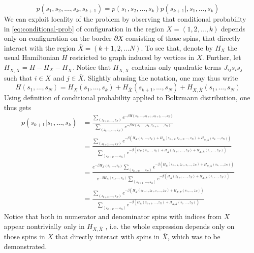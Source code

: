 \begin{equation}
\label{eq:conditional-prob}
    p(s_1, s_2, \ldots, s_k, s_{k+1}) = p(s_1, s_2, \ldots, s_k)p(s_{k+1}|, s_1, \ldots, s_k)
\end{equation}
We can exploit locality of the problem by observing that conditional probability in \eqref{eq:conditional-prob} of configuration in the region $X = (1, 2, \ldots, k)$ depends only on configuration on the border $\partial X$ consisting of those spins, that directly interact with the region $\overline{X} = (k+1, 2, \ldots N)$. To see that, denote by $H_X$ the usual Hamiltonian $H$ restricted to graph induced by vertices in $X$. Further, let $H_{X, \overline{X}} = H - H_X - H_{\overline{X}}$. Notice that $H_{X, \overline{X}}$ contains only quadratic terms $J_{ij} s_i s_j$ such that $i \in X$ and $j \in \overline{X}$. Slightly abusing the notation, one may thus write
\begin{equation}
H(s_1, \ldots, s_N) = H_X(s_1, \ldots, s_k) + H_{\overline{X}}(s_{k+1}, \ldots, s_N) + H_{X, \overline{X}}(s_1, \ldots, s_N)
\end{equation}
Using definition of conditional probability applied to Boltzmann distribution, one thus gets
\begin{align}
    p(s_{k+1}|s_1, \ldots, s_k) &= \frac{\sum\limits_{(z_{k+2}, \ldots, z_N)}e^{-\beta H(s_1, \ldots, s_{k+1}, z_{k+2},\ldots,z_N)}}{\sum\limits_{(z_{k+1}, \ldots, z_N)}e^{-\beta H(s_1, \ldots, s_k, z_{k+1},\ldots,z_N)}} \\
    &= \frac{\sum\limits_{(z_{k+2}, \ldots, z_N)}e^{-\beta (H_X(s_1, \ldots, s_k) + H_{\overline{X}}(s_{k+1}, z_{k+2},\ldots,z_N) + H_{X, \overline{X}}(s_1, \ldots, z_N))}}{\sum\limits_{(z_{k+1}, \ldots, z_N)}e^{-\beta (H_X(s_1, \ldots, s_k) + H_{\overline{X}}(z_{k+1}, \ldots,z_N) + H_{X, \overline{X}}(s_1, \ldots, z_N))}} \\
    & = \frac{e^{-\beta H_X(s_1, \ldots, s_k)}\sum\limits_{(z_{k+2}, \ldots, z_N)} e^{-\beta(H_{\overline{X}}(s_{k+1}, z_{k+2},\ldots,z_N) + H_{X, \overline{X}}(s_1, \ldots, z_N))}}{e^{-\beta H_X(s_1, \ldots, s_k)}\sum\limits_{(z_{k+1}, \ldots, z_N)}e^{ -\beta(H_{\overline{X}}(z_{k+1}, \ldots,z_N) + H_{X, \overline{X}}(s_1, \ldots, z_N))}} \\
    & = \frac{\sum\limits_{(z_{k+2}, \ldots, z_N)} e^{-\beta(H_{\overline{X}}(s_{k+1}, z_{k+2},\ldots,z_N) + H_{X, \overline{X}}(s_1, \ldots, z_N))}}{\sum\limits_{(z_{k+1}, \ldots, z_N)}e^{ -\beta(H_{\overline{X}}(z_{k+1}, \ldots,z_N) + H_{X, \overline{X}}(s_1, \ldots, z_N))}}
\end{align}
Notice that both in numerator and denominator spins with indices from $X$ appear nontrivially only in $H_{X, \overline{X}}$ , i.e. the whole expression depends only on those spins in $X$ that directly interact with spins in $\overline{X}$, which was to be demonstrated.


